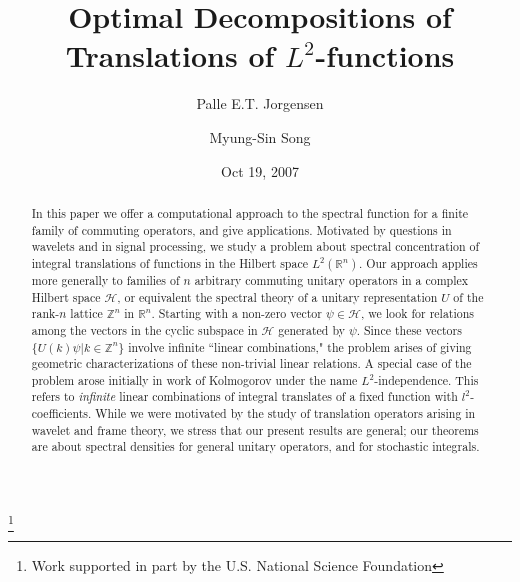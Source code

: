\documentclass{birkmult}
\theoremstyle{definition}
\theoremstyle{remark}
\numberwithin{equation}{section}
\begin{document}
\title[Optimal Decompositions of Translations of $L^{2}$-functions]
 {Optimal Decompositions of Translations of $L^{2}$-functions}
\author[Palle E.T. Jorgensen]{Palle E.T. Jorgensen}

\address{Department of Mathematics\\
The University of Iowa\\
14 MacLean Hall\\
Iowa City, IA 52242}


\thanks{Work supported in part by the U.S. National Science
Foundation}
\author{Myung-Sin Song}
\address{Department of Mathematics and Statistics\\
Southern Illinois University Edwardsville\\
Campus Box 1653, Science Building\\
Edwardsville, IL 62026}


\date{Oct 19, 2007}

\begin{abstract}
In this paper we offer a computational approach to the spectral function for a finite family of commuting operators, and give applications. 
Motivated by questions in wavelets and in signal processing, we study a 
problem about spectral concentration of integral translations of functions 
in the Hilbert space $L^{2}(\mathbb{R}^{n})$. Our approach applies more 
generally to families of $n$ arbitrary commuting unitary operators in a 
complex Hilbert space $\mathcal{H}$, or equivalent the spectral theory of 
a unitary representation $U$ of the rank-$n$ lattice $\mathbb{Z}^{n}$ in 
$\mathbb{R}^{n}$. Starting with a non-zero vector $\psi \in \mathcal{H}$, 
we look for relations among the vectors in the cyclic subspace in 
$\mathcal{H}$ generated by $\psi$. Since these vectors 
$\{U(k)\psi | k \in \mathbb{Z}^{n}\}$
involve infinite ``linear combinations," the problem arises of giving 
geometric characterizations of these non-trivial linear relations. A 
special case of the problem arose initially in work of Kolmogorov under 
the name $L^{2}$-independence. This refers to \textit{infinite} linear 
combinations of integral translates of a fixed function with 
$l^{2}$-coefficients.  While we were motivated by the study of translation 
operators arising in wavelet and frame theory, we stress that our present 
results are general; our theorems are about spectral densities for general 
unitary operators, and for stochastic integrals.
\end{abstract}
\end{document}
